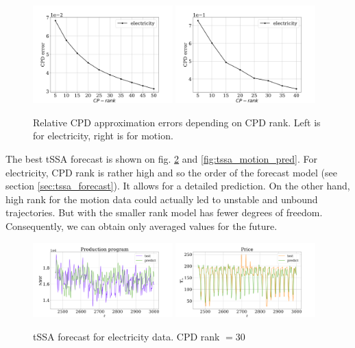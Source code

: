 \documentclass[referee, pdflatex, sn-mathphys-num]{sn-jnl}
\theoremstyle{definition}
\theoremstyle{plain}
\begin{document}
	\begin{figure}[h]
		\centering
		\includegraphics[width=0.48\textwidth, keepaspectratio]{CPD_error_elec.png}
		\includegraphics[width=0.48\textwidth, keepaspectratio]{CPD_error_motion.png}
		\caption{Relative CPD approximation errors depending on CPD rank. Left is for electricity, right is for motion.}\label{fig:cpd_errors}
	\end{figure}
	
	The best tSSA forecast is shown on fig. \ref{fig:tssa_electr_pred} and \ref{fig:tssa_motion_pred}. For electricity, CPD rank is rather high and so the order of the forecast model (see section \ref{sec:tssa_forecast}). It allows for a detailed prediction. On the other hand, high rank for the motion data could actually led to unstable and unbound trajectories. But with the smaller rank model has fewer degrees of freedom. Consequently, we can obtain only averaged values for the future.
	
	\begin{figure}[h]
		\centering
		\includegraphics[width=0.48\textwidth, keepaspectratio]{Production_program_pred.png}
		\includegraphics[width=0.48\textwidth, keepaspectratio]{Price_pred.png}
		\caption{tSSA forecast for electricity data. CPD rank $ = 30 $}\label{fig:tssa_electr_pred}
	\end{figure}
	
\end{document}
